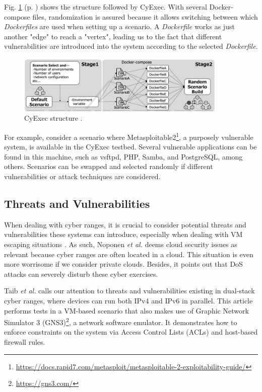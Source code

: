 Fig. \ref{fig:cyexec_structure} (p. \pageref{fig:cyexec_structure}) shows the structure followed by CyExec. With several Docker-compose files, randomization is assured because it allows switching between which \textit{Dockerfiles} are used when setting up a scenario. A \textit{Dockerfile} works as just another "edge"  to reach a "vertex", leading us to the fact that different vulnerabilities are introduced into the system according to the selected \textit{Dockerfile}.

\begin{figure}[H]
    \includegraphics[width=10cm]{figures/cyexec_structure.png}
    \caption{CyExec structure \cite{cyexec_ref}.}
    \label{fig:cyexec_structure}
\end{figure}

For example, consider a scenario where Metasploitable2\footnote{\url{https://docs.rapid7.com/metasploit/metasploitable-2-exploitability-guide/}}, a purposely vulnerable system, is available in the CyExec testbed. Several vulnerable applications can be found in this machine, such as vsftpd, PHP, Samba, and PostgreSQL, among others. Scenarios can be swapped and selected randomly if different vulnerabilities or attack techniques are considered.


\subsection{Threats and Vulnerabilities} \label{sec:threats_vulnerabilities_cr}

When dealing with cyber ranges, it is crucial to consider potential threats and vulnerabilities these systems can introduce, especially when dealing with VM escaping situations \cite{pandora_ref}. As such, Noponen \textit{et al.} \cite{cybersecurity_threat_and_mitigations_ref} deems cloud security issues as relevant because cyber ranges are often located in a cloud. This situation is even more worrisome if we consider private clouds. Besides, it points out that DoS attacks can severely disturb these cyber exercises.


Taib \textit{et al.} \cite{threats_and_vulnerabilities_ref} calls our attention to threats and vulnerabilities existing in dual-stack cyber ranges, where devices can run both IPv4 and IPv6 in parallel. This article performs tests in a VM-based scenario that also makes use of Graphic Network Simulator 3 (GNS3)\footnote{\url{https://gns3.com/}}, a network software emulator. It demonstrates how to enforce constraints on the system via Access Control Lists (ACLs) and host-based firewall rules.

